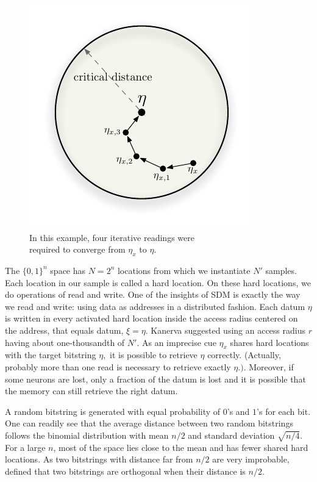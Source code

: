 \begin{figure}[!htb]
\centering\includegraphics[scale=0.75]{./images02/p1_p2_iter_read.pdf}

\caption{In this example, four iterative readings were\protect \\
required to converge from $\eta_{x}$ to $\eta$.\label{fig-p1-p2-iterative-read}}
\end{figure}


The $\{0,1\}^{n}$ space has $N=2^{n}$ locations from which we instantiate $N'$ samples. Each location in our sample is called a hard location.  On these hard locations, we do operations of read and write. One of the insights of SDM is exactly the way we read and write: using data as addresses in a distributed fashion. Each datum $\eta$ is written in every activated hard location inside the access radius centered on the address, that equals datum, $\xi=\eta$. Kanerva suggested using an access radius $r$ having about one-thousandth of $N'$.  As an imprecise cue $\eta_{x}$ shares hard locations with the target bitstring $\eta,$ it is possible to retrieve $\eta$ correctly. (Actually, probably more than one read is necessary to retrieve exactly $\eta.)$.  Moreover, if some neurons are lost, only a fraction of the datum is lost and it is possible that the memory can still retrieve the right datum.

A random bitstring is generated with equal probability of $0$'s and $1$'s for each bit. One can readily see that the average distance between two random bitstrings follows the binomial distribution with mean $n/2$ and standard deviation $\sqrt{n/4}$. For a large $n$, most of the space lies close to the mean and has fewer shared hard locations.  As two bitstrings with distance far from $n/2$ are very improbable, \citet{Kanerva1988} defined that two bitstrings are orthogonal when their distance is $n/2$.

